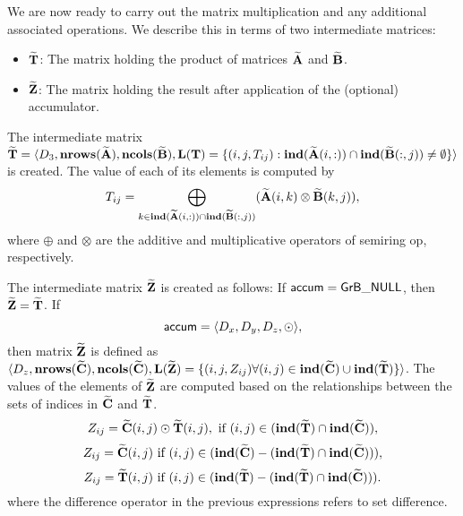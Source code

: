 %
%

We are now ready to carry out the matrix multiplication and any additional associated operations.    We describe
this in terms of two intermediate matrices:
\begin{itemize}
\item ${\bf \widetilde{T}}$: The matrix holding the product of matrices ${\bf \widetilde{A}}$ and ${\bf \widetilde{B}}$.
\item ${\bf \widetilde{Z}}$: The matrix holding the result after application of the (optional) accumulator.
\end{itemize}

The intermediate matrix ${\bf \widetilde{T}} = \langle
D_3, \bold{nrows}({\bf \widetilde{A}}),
\bold{ncols}({\bf \widetilde{B}}), \bold{L}({\bf T}) =
\{(i,j,T_{ij}) : \bold{ind}({\bf \widetilde{A}}(i,:)) \cap
\bold{ind}({\bf \widetilde{B}}(:,j)) \neq \emptyset \} \rangle$
is created.  The value of each of its elements is computed by \[T_{ij}
= \bigoplus_{k \in \bold{ind}({\bf \widetilde{A}}(i,:)) \cap
\bold{ind}({\bf \widetilde{B}}(:,j))} ({\bf \widetilde{A}}(i,k)
\otimes {\bf \widetilde{B}}(k,j)),\] where $\oplus$ and $\otimes$
are the additive and multiplicative operators of semiring {\sf op},
respectively.

The intermediate  matrix ${\bf \widetilde{Z}}$ is created as follows:
If ${\sf accum} = {\sf GrB\_NULL}$, then ${\bf \widetilde{Z}} = {\bf \widetilde{T}}$.
If \[ {\sf accum} = \langle D_x, D_y, D_z, \odot \rangle, \] then matrix ${\bf \widetilde{Z}}$ is defined as $\langle D_z, \bold{nrows}({\bf \widetilde{C}}), \bold{ncols}({\bf \widetilde{C}}), \bold{L}({\bf \widetilde{Z}}) 
		= \{(i,j,Z_{ij})  \forall (i,j) \in \bold{ind}({\bf \widetilde{C}}) \cup \bold{ind}({\bf \widetilde{T}}) \} \rangle$.  
The values of the elements of ${\bf \widetilde{Z}}$ are computed based on the relationships between the sets of indices in ${\bf \widetilde{C}}$ and ${\bf \widetilde{T}}$.
\[
Z_{ij} = {\bf \widetilde{C}}(i,j) \odot {\bf \widetilde{T}}(i,j), \ \mbox{if}\  (i,j) \in  (\bold{ind}({\bf \widetilde{T}}) \cap \bold{ind}({\bf \widetilde{C}})),
\]
\[
Z_{ij} = \matrix{\widetilde{C}}(i,j) \ \mbox{if}\  (i,j) \in  (\bold{ind}(\matrix{\widetilde{C}}) - (\bold{ind}(\matrix{\widetilde{T}}) \cap \bold{ind}(\matrix{\widetilde{C}}))),
\]
\[
Z_{ij} = \matrix{\widetilde{T}}(i,j) \ \mbox{if}\  (i,j) \in  (\bold{ind}(\matrix{\widetilde{T}}) - (\bold{ind}(\matrix{\widetilde{T}}) \cap \bold{ind}(\matrix{\widetilde{C}}))).
\]
where the difference operator in the previous expressions refers to set difference.

